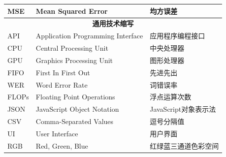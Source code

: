 \begin{center}
\begin{longtable}{m{2.5cm}m{6.5cm}m{5.5cm}}
        MSE & Mean Squared Error & 均方误差 \\
        \midrule
        \multicolumn{3}{c}{\textbf{通用技术缩写}} \\
        \midrule
        API & Application Programming Interface & 应用程序编程接口 \\
        CPU & Central Processing Unit & 中央处理器 \\
        GPU & Graphics Processing Unit & 图形处理器 \\
        FIFO & First In First Out & 先进先出 \\
        WER & Word Error Rate & 词错误率 \\
        FLOPs & Floating Point Operations & 浮点运算次数 \\
        JSON & JavaScript Object Notation & JavaScript对象表示法 \\
        CSV & Comma-Separated Values & 逗号分隔值 \\
        UI & User Interface & 用户界面 \\
        RGB & Red, Green, Blue & 红绿蓝三通道色彩空间 \\
        \end{longtable}
\end{center}
